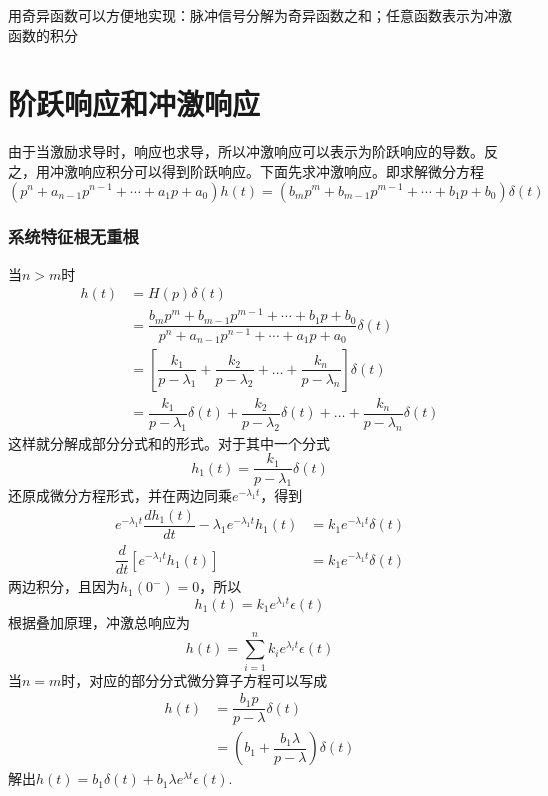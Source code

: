 用奇异函数可以方便地实现：脉冲信号分解为奇异函数之和；任意函数表示为冲激函数的积分
\section{阶跃响应和冲激响应}
由于当激励求导时，响应也求导，所以冲激响应可以表示为阶跃响应的导数。反之，用冲激响应积分可以得到阶跃响应。下面先求冲激响应。即求解微分方程
\begin{equation}
    (p^n+a_{n-1}p^{n-1}+\cdots + a_1 p +a_0)h(t)=(b_m p^m+b_{m-1}p^{m-1}+\cdots + b_1 p+b_0)\delta(t)
\end{equation}
\subsubsection{系统特征根无重根}
当$n>m$时
\begin{align}
    h(t)&=H(p)\delta(t)\\
    &=\dfrac{b_m p^m+b_{m-1}p^{m-1}+\cdots + b_1 p+b_0}{p^n+a_{n-1}p^{n-1}+\cdots + a_1 p +a_0}\delta(t)\\
    &=\left[ \dfrac{k_1}{p-\lambda_1} +\dfrac{k_2}{p-\lambda_2}+\dots +\dfrac{k_n}{p-\lambda_n}\right] \delta(t)\\
    &=\dfrac{k_1}{p-\lambda_1}\delta(t)+\dfrac{k_2}{p-\lambda_2}\delta(t)+\dots+\dfrac{k_n}{p-\lambda_n}\delta(t)
\end{align}
这样就分解成部分分式和的形式。对于其中一个分式
\begin{equation}
    h_1(t)=\dfrac{k_1}{p-\lambda_1}\delta(t)
\end{equation}
还原成微分方程形式，并在两边同乘$e^{-\lambda_1 t}$，得到 
\begin{align}
    e^{-\lambda_1 t} \dfrac{dh_1(t)}{dt}-\lambda_1 e^{-\lambda_1 t} h_1(t)&=k_1 e^{-\lambda_1 t} \delta(t)\\
    \dfrac{d}{dt}[e^{-\lambda_1 t} h_1(t)] &= k_1 e^{-\lambda_1 t} \delta(t)
\end{align}
两边积分，且因为$h_1(0^-)=0$，所以
\begin{equation}
    h_1(t)=k_1 e^{\lambda_1 t} \epsilon(t)
\end{equation}
根据叠加原理，冲激总响应为
\begin{equation}
    h(t)=\sum_{i=1}^{n}k_i e^{\lambda_i t}\epsilon(t)
\end{equation}
当$n=m$时，对应的部分分式微分算子方程可以写成
\begin{align}
    h(t)&=\dfrac{b_1 p}{p-\lambda}\delta(t)\\
        &=(b_1+\dfrac{b_1 \lambda}{p-\lambda})\delta(t)
\end{align}
解出$h(t)=b_1\delta(t)+b_1 \lambda e^{\lambda t}\epsilon(t)$.

